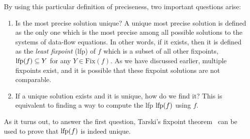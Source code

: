 By using this particular definition of preciseness, two important questions
arise:
\begin{enumerate}

    \item Is the most precise solution unique?  A unique most precise solution
    is defined as the only one which is the most precise among all possible
    solutions to the systems of data-flow equations.  In other words, if it
    exists, then it is defined as the \emph{least fixpoint} (\gls{lfp}) of
    $f$ which is a subset of all other fixpoints, \ie~$\operatorname{\mathrm{lfp}} (f) \subseteq Y$
    for any $Y \in \mathrm{Fix}(f)$.  As we have discussed earlier, multiple
    fixpoints exist, and it is possible that these fixpoint solutions are not
    comparable.

    \item If a unique solution exists and it is unique, how do we find it?
    This is equivalent to finding a way to compute the \gls{lfp} $\operatorname{\mathrm{lfp}}(f)$
    using $f$.

\end{enumerate}

As it turns out, to answer the first question, Tarski's fixpoint
theorem~\cite{tarski55, nielson99} can be used to prove that $\operatorname{\mathrm{lfp}} (f)$ is
indeed unique.

